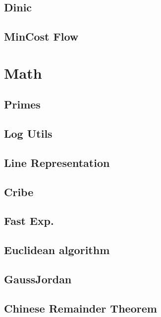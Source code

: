 \subsection{  Dinic}
\raggedbottom
\hrulefill
\subsection{ MinCost Flow}
\raggedbottom
\hrulefill

\section{Math}
\subsection{ Primes}
\raggedbottom
\hrulefill
\subsection{Log Utils}
\raggedbottom
\hrulefill
\subsection{   Line Representation}
\raggedbottom
\hrulefill
\subsection{Cribe}
\raggedbottom
\hrulefill
\subsection{ Fast Exp.}
\raggedbottom
\hrulefill
\subsection{  Euclidean algorithm}
\raggedbottom
\hrulefill
\subsection{  GaussJordan}
\raggedbottom
\hrulefill
\subsection{   Chinese Remainder Theorem}
\raggedbottom
\hrulefill

